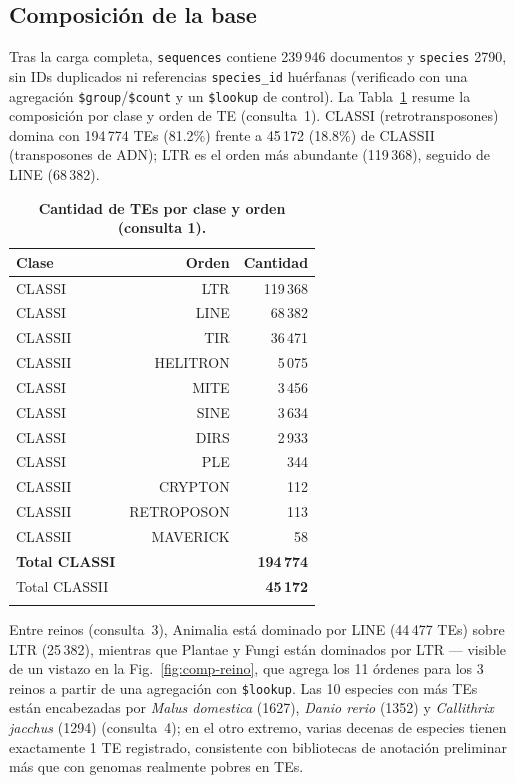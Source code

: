 \documentclass[pdflatex,sn-vancouver-num,lineno,referee]{sn-jnl}
\begin{document}
\subsection{Composición de la base}

Tras la carga completa, \texttt{sequences} contiene 239\,946 documentos y
\texttt{species} 2790, sin IDs duplicados ni referencias
\texttt{species\_id} huérfanas (verificado con una agregación
\texttt{\$group}/\texttt{\$count} y un \texttt{\$lookup} de control). La
Tabla~\ref{tab:composicion} resume la composición por clase y orden de TE
(consulta~1). CLASSI (retrotransposones) domina con 194\,774 TEs (81.2\%)
frente a 45\,172 (18.8\%) de CLASSII (transposones de ADN); LTR es el orden
más abundante (119\,368), seguido de LINE (68\,382).

\begin{table}[!ht]
\caption{\textbf{Cantidad de TEs por clase y orden (consulta 1).}}
\begin{tabular}{@{}lrr@{}}
\toprule
Clase & Orden & Cantidad \\
\midrule
CLASSI  & LTR       & 119\,368 \\
CLASSI  & LINE      & 68\,382 \\
CLASSII & TIR       & 36\,471 \\
CLASSII & HELITRON  & 5\,075 \\
CLASSI  & MITE      & 3\,456 \\
CLASSI  & SINE      & 3\,634 \\
CLASSI  & DIRS      & 2\,933 \\
CLASSI  & PLE       & 344 \\
CLASSII & CRYPTON   & 112 \\
CLASSII & RETROPOSON& 113 \\
CLASSII & MAVERICK  & 58 \\
\midrule
\textbf{Total CLASSI}  & & \textbf{194\,774} \\
Total CLASSII & & \textbf{45\,172} \\
\botrule
\end{tabular}
\label{tab:composicion}
\end{table}

Entre reinos (consulta~3), Animalia está dominado por LINE (44\,477 TEs)
sobre LTR (25\,382), mientras que Plantae y Fungi están dominados por LTR ---
visible de un vistazo en la Fig.~\ref{fig:comp-reino}, que agrega los 11
órdenes para los 3 reinos a partir de una agregación con \texttt{\$lookup}.
Las 10 especies con más TEs están encabezadas por \emph{Malus domestica}
(1627), \emph{Danio rerio} (1352) y \emph{Callithrix jacchus} (1294)
(consulta~4); en el otro extremo, varias decenas de especies tienen
exactamente 1 TE registrado, consistente con bibliotecas de anotación
preliminar más que con genomas realmente pobres en TEs.
\end{document}
